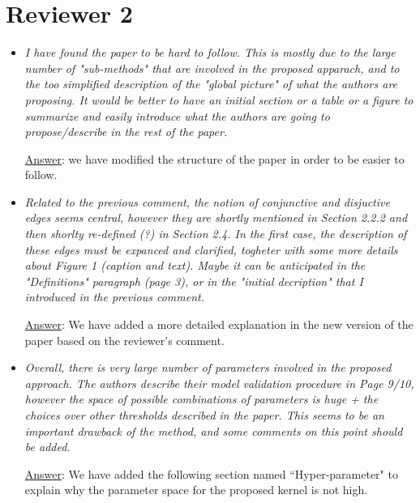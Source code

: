 \documentclass[11pt]{article}
\begin{document}
\section{Reviewer 2}
\begin{itemize}
\item \textit{I have found the paper to be hard to follow. This is mostly due to the large number of "sub-methods" that are involved in the proposed apparach, and to the too simplified description of the "global picture" of what the authors are proposing. It would be better to have an initial section or a table or a figure to summarize and easily introduce what the authors are going to propose/describe in the rest of the paper.}

\underline{Answer}: we have modified the structure of the paper in order to be easier to follow.

\item \textit{Related to the previous comment, the notion of conjunctive and disjuctive edges seems central, however they are shortly mentioned in Section 2.2.2 and then shorlty re-defined (?) in Section 2.4. In the first case, the description of these edges must be expanced and clarified, togheter with some more details about Figure 1 (caption and text). Maybe it can be anticipated in the "Definitions" paragraph (page 3), or in the "initial decription" that I introduced in the previous comment.}

\underline{Answer}: We have added a more detailed explanation in the new version of the paper based on the reviewer's comment.

\item \textit{Overall, there is very large number of parameters involved in the proposed approach. The authors describe their model validation procedure in Page 9/10, however the space of possible combinations of parameters is huge + the choices over other thresholds described in the paper. This seems to be an important drawback of the method, and some comments on this point should be added.}

\underline{Answer}: We have added the following section named ``Hyper-parameter" to explain why the parameter space for the proposed kernel is not high.\\


\end{itemize}
\end{document}
